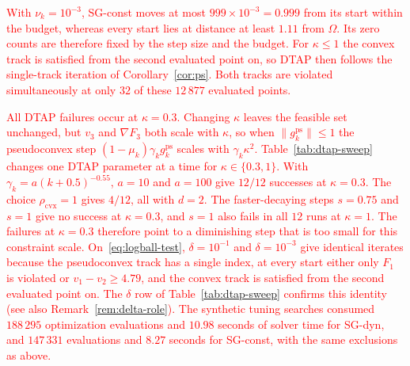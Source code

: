 \documentclass[]{interact}
\theoremstyle{plain}
\theoremstyle{definition}
\theoremstyle{remark}
\newcommand{\cvx}{\mathrm{cvx}}
\newcommand{\ps}{\mathrm{ps}}
\begin{document}
\leavevmode\textcolor{red}{With $\nu_k=10^{-3}$, SG-const moves at most $999\times10^{-3}=0.999$ from its start within the budget, whereas every start lies at distance at least $1.11$ from $\Omega$. Its zero counts are therefore fixed by the step size and the budget. For $\kappa\le1$ the convex track is satisfied from the second evaluated point on, so DTAP then follows the single-track iteration of Corollary~\ref{cor:ps}. Both tracks are violated simultaneously at only $32$ of these $12\,877$ evaluated points.}

\leavevmode\textcolor{red}{All DTAP failures occur at $\kappa=0.3$. Changing $\kappa$ leaves the feasible set unchanged, but $v_3$ and $\nabla F_3$ both scale with $\kappa$, so when $\|g^{\ps}_k\|\le1$ the pseudoconvex step $(1-\mu_k)\gamma_k g^{\ps}_k$ scales with $\gamma_k\kappa^2$. Table~\ref{tab:dtap-sweep} changes one DTAP parameter at a time for $\kappa\in\{0.3,1\}$. With $\gamma_k=a(k+0.5)^{-0.55}$, $a=10$ and $a=100$ give $12/12$ successes at $\kappa=0.3$. The choice $\rho_{\cvx}=1$ gives $4/12$, all with $d=2$. The faster-decaying steps $s=0.75$ and $s=1$ give no success at $\kappa=0.3$, and $s=1$ also fails in all $12$ runs at $\kappa=1$. The failures at $\kappa=0.3$ therefore point to a diminishing step that is too small for this constraint scale. On~\eqref{eq:logball-test}, $\delta=10^{-1}$ and $\delta=10^{-3}$ give identical iterates because the pseudoconvex track has a single index, at every start either only $F_1$ is violated or $v_1-v_2\ge4.79$, and the convex track is satisfied from the second evaluated point on. The $\delta$ row of Table~\ref{tab:dtap-sweep} confirms this identity (see also Remark~\ref{rem:delta-role}). The synthetic tuning searches consumed $188\,295$ optimization evaluations and $10.98$ seconds of solver time for SG-dyn, and $147\,331$ evaluations and $8.27$ seconds for SG-const, with the same exclusions as above.}
\end{document}
